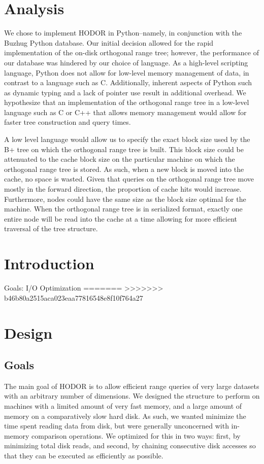 \documentclass[11pt, oneside]{article}
\begin{document}
\section{Analysis}

We chose to implement HODOR in Python--namely, in conjunction with the Buzhug Python database. Our initial decision allowed for the rapid implementation of the on-disk orthogonal range tree; however, the performance of our database was hindered by our choice of language. As a high-level scripting language, Python does not allow for low-level memory management of data, in contrast to a language such as C. Additionally, inherent aspects of Python such as dynamic typing and a lack of pointer use result in additional overhead. We hypothesize that an implementation of the orthogonal range tree in a low-level language such as C or C++ that allows memory management would allow for faster tree construction and query times. 

A low level language would allow us to specify the exact block size used by the B+ tree on which the orthogonal range tree is built. This block size could be attenuated to the cache block size on the particular machine on which the orthogonal range tree is stored. As such, when a new block is moved into the cache, no space is wasted. Given that queries on the orthogonal range tree move mostly in the forward direction, the proportion of cache hits would increase. Furthermore, nodes could have the same size as the block size optimal for the machine. When the orthogonal range tree is in serialized format, exactly one entire node will be read into the cache at a time allowing for more efficient traversal of the tree structure.









\section{Introduction}
Goals:
	I/O Optimization
=======
>>>>>>> b46b80a2515aca023eaa77816548e8f10f764a27
    


\section{Design}

\subsection{Goals}
The main goal of HODOR is to allow efficient range queries of very large
datasets with an arbitrary number of dimensions. We designed the structure to
perform on machines with a limited amount of very fast memory, and a large
amount of memory on a comparatively slow hard disk. As such, we wanted minimize
the time spent reading data from disk, but were generally unconcerned with
in-memory comparison operations. We optimized for this in two ways: first, by
minimizing total disk reads, and second, by chaining consecutive disk accesses
so that they can be executed as efficiently as possible. 
\end{document}
